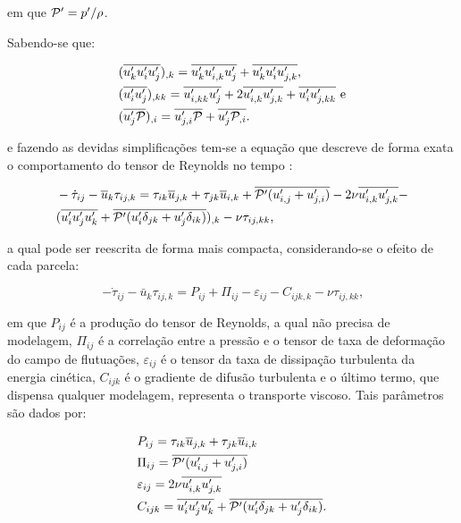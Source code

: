 \documentclass[_ArquivoPrincipal.tex]{subfiles}
\begin{document}
\noindent em que $\mathcal{P}'=p'/\rho$.

Sabendo-se que:

\begin{subequations}
    \begin{align}
         & (\overline{u'_ku'_iu'_j})_{,k}=\overline{u'_ku'_{i,k}u'_j}+\overline{u'_ku'_iu'_{j,k}}\text{,}                 \\
         & (\overline{u'_iu'_j})_{,kk}=\overline{u'_{i,kk}u'_j}+2\overline{u'_{i,k}u'_{j,k}}+\overline{u'_iu'_{j,kk}}\text{ e} \\
         & (\overline{u'_j\mathcal{P}})_{,i}=\overline{u'_{j,i}\mathcal{P}}+\overline{u'_j\mathcal{P}_{,i}}\text{.}
    \end{align}
\end{subequations}

\noindent e fazendo as devidas simplificações tem-se a equação que descreve de forma exata o comportamento do tensor de Reynolds no tempo \cite{rotta1951statistische,alfonsi2009reynolds}:

\begin{equation}
    \begin{split}
        &-\dot{\tau}_{ij}-\overline{u}_k\tau_{ij,k}=\tau_{ik}\overline{u}_{j,k}+\tau_{jk}\overline{u}_{i,k}+\overline{\mathcal{P}'(u'_{i,j}+u'_{j,i})}-2\nu\overline{u'_{i,k}u'_{j,k}}-\\
        &(\overline{u'_iu'_ju'_k}+\overline{\mathcal{P}'(u'_i\delta_{jk}+u'_j\delta_{ik})})_{,k}-\nu\tau_{ij,kk}\text{,}
    \end{split}
\end{equation}

\noindent a qual pode ser reescrita de forma mais compacta, considerando-se o efeito de cada parcela:

\begin{equation}
    -\dot{\tau}_{ij}-\bar{u}_k\tau_{ij,k}=P_{ij}+\Pi_{ij}-\varepsilon_{ij}-C_{ijk,k}-\nu\tau_{ij,kk}\text{,}
\end{equation}

\noindent em que $P_{ij}$ é a produção do tensor de Reynolds, a qual não precisa de modelagem, $\Pi_{ij}$ é a correlação entre a pressão e o tensor de taxa de deformação do campo de flutuações, $\varepsilon_{ij}$ é o tensor da taxa de dissipação turbulenta da energia cinética, $C_{ijk}$ é o gradiente de difusão turbulenta e o último termo, que dispensa qualquer modelagem, representa o transporte viscoso. Tais parâmetros são dados por:

\begin{subequations}
    \begin{align}
         & P_{ij}=\tau_{ik}\overline{u}_{j,k}+\tau_{jk}\overline{u}_{i,k}                           \\
         & \Pi_{ij}=\overline{\mathcal{P}'(u'_{i,j}+u'_{j,i})}                                         \\
         & \varepsilon_{ij}=2\nu\overline{u'_{i,k}u'_{j,k}}                                    \\
         & C_{ijk}=\overline{u'_iu'_ju'_k}+\overline{\mathcal{P}'(u'_i\delta_{jk}+u'_j\delta_{ik})}\text{.}
    \end{align}
\end{subequations}
\end{document}
